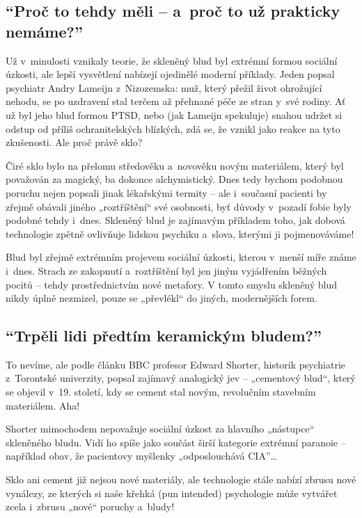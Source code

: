 \documentclass[main.tex]{subfiles}
\begin{document}
\subsection*{\enquote{Proč to tehdy měli – a~proč to už prakticky nemáme?}}
Už v~minulosti vznikaly teorie, že skleněný blud byl extrémní formou sociální úzkosti, ale lepší vysvětlení nabízejí ojedinělé moderní příklady. Jeden popsal psychiatr Andry Lameijn z~Nizozemska: muž, který přežil život ohrožující nehodu, se po uzdravení stal terčem až přehnané péče ze stran y~své rodiny. Ať už byl jeho blud formou PTSD, nebo (jak Lameijn spekuluje) snahou udržet si odstup od příliš ochranitelských blízkých, zdá se, že vznikl jako reakce na tyto zkušenosti. Ale proč právě sklo?\par
Čiré sklo bylo na přelomu středověku a~novověku novým materiálem, který byl považován za magický, ba dokonce alchymistický. Dnes tedy bychom podobnou poruchu nejen popsali jinak lékařskými termity – ale i~současní pacienti by zřejmě obávali jiného „roztříštění“ své osobnosti, byť důvody v~pozadí fobie byly podobné tehdy i~dnes. Skleněný blud je zajímavým příkladem toho, jak dobová technologie zpětně ovlivňuje lidskou psychiku a~slova, kterými ji pojmenováváme!\par
Blud byl zřejmě extrémním projevem sociální úzkosti, kterou v~menší míře známe i~dnes. Strach ze zakopnutí a~roztříštění byl jen jiným vyjádřením běžných pocitů – tehdy prostřednictvím nové metafory. V tomto smyslu skleněný blud nikdy úplně nezmizel, pouze se „převlékl“ do jiných, modernějších forem.
\subsection*{\enquote{Trpěli lidi předtím keramickým bludem?}}
To nevíme, ale podle článku BBC profesor Edward Shorter, historik psychiatrie z~Torontské univerzity, popsal zajímavý analogický jev – „cementový blud“, který se objevil v~19. století, kdy se cement stal novým, revolučním stavebním materiálem. Aha!\par
Shorter mimochodem nepovažuje sociální úzkost za hlavního „nástupce“ skleněného bludu. Vidí ho spíše jako součást širší kategorie extrémní paranoie – například obav, že pacientovy myšlenky „odposlouchává CIA”…\par
Sklo ani cement již nejsou nové materiály, ale technologie stále nabízí zbrusu nové vynálezy, ze kterých si naše křehká (pun intended) psychologie může vytvářet zcela i~zbrusu „nové“ poruchy a~bludy!
\newpage
\end{document}
